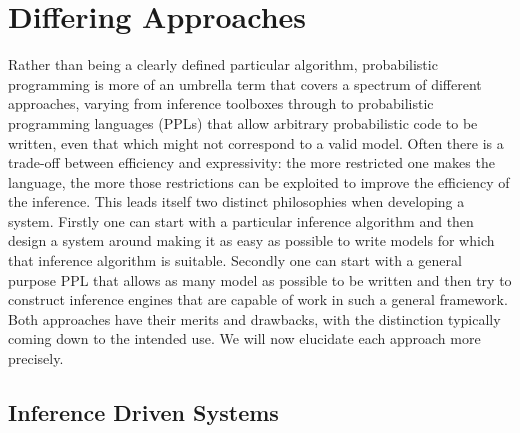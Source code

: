 
\section{Differing Approaches}
\label{sec:probprog:two}

Rather than being a clearly defined particular algorithm,
probabilistic programming is more of an umbrella term that covers a spectrum of 
different approaches, varying from inference toolboxes through to probabilistic programming
languages (PPLs) that allow
arbitrary probabilistic code to be written, even that which might not correspond to a valid
model.  Often there is a trade-off between efficiency and expressivity: the more restricted
one makes the language, the more those restrictions can be exploited to improve the efficiency
of the inference.  This leads itself two distinct philosophies when developing a system. 
Firstly one can start with a particular inference algorithm and then design a system around making it as
easy as possible to write models for which that inference algorithm is suitable.  Secondly one can start
with  a general purpose PPL that allows as many model as possible to be written and then try to construct
inference engines that are capable of work in such a general framework.  Both approaches 
have their merits and drawbacks, with the distinction typically coming down to the intended use.
We will now elucidate each approach more precisely.  

\subsection{Inference Driven Systems}
\label{sec:probprog:two:inf}

